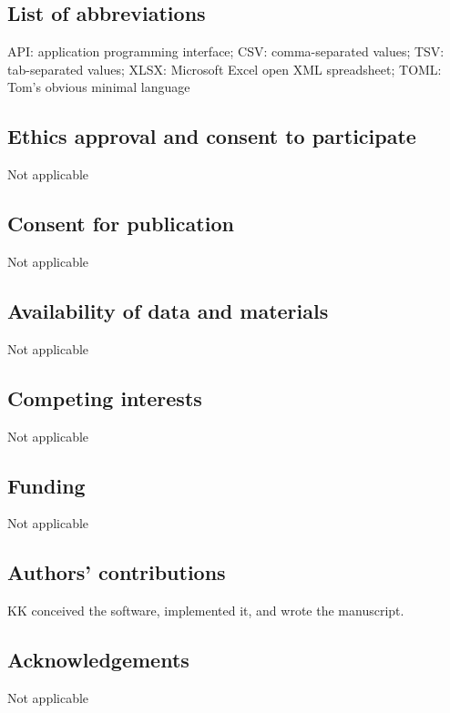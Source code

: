 \documentclass{bmcart}
\begin{document}
\subsection*{List of abbreviations}

API: application programming interface; CSV: comma-separated values;
TSV: tab-separated values; XLSX: Microsoft Excel open XML spreadsheet;
TOML: Tom's obvious minimal language

\subsection*{Ethics approval and consent to participate}
Not applicable

\subsection*{Consent for publication}
Not applicable

\subsection*{Availability of data and materials}
Not applicable

\subsection*{Competing interests}
Not applicable

\subsection*{Funding}
Not applicable

\subsection*{Authors' contributions}
KK conceived the software, implemented it, and wrote the manuscript.

\subsection*{Acknowledgements}
Not applicable

\end{document}
